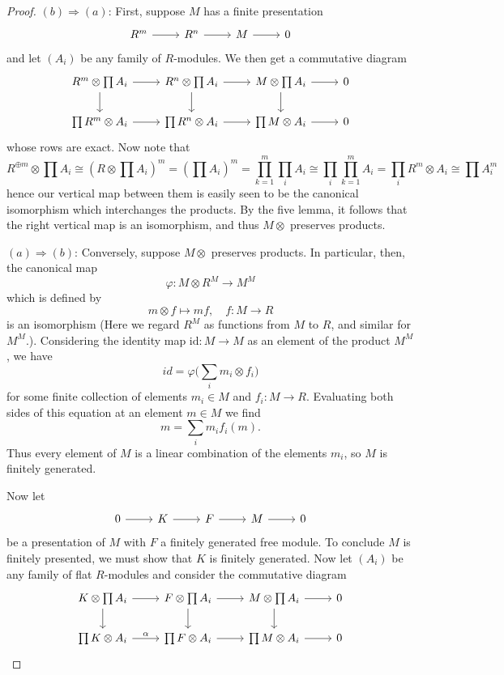 \begin{proof}
$(b)\Rightarrow(a)$: First, suppose $M$ has a finite presentation
\[\begin{tikzcd}
R^m\ar[r]&R^n\ar[r]&M\ar[r]&0
\end{tikzcd}\]
and let $(A_i)$ be any family of $R$-modules. We then get a commutative diagram
\[\begin{tikzcd}
R^m\otimes\prod A_i\ar[r]\ar[d]&R^n\otimes\prod A_i\ar[r]\ar[d]&M\otimes\prod A_i\ar[r]\ar[d]&0\\
\prod R^m\otimes A_i\ar[r]&\prod R^n\otimes A_i\ar[r]&\prod M\otimes A_i\ar[r]&0
\end{tikzcd}\]
whose rows are exact. Now note that 
\[R^{\oplus m}\otimes\prod A_i\cong(R\otimes\prod A_i)^m=(\prod A_i)^m=\prod_{k=1}^{m}\prod_i A_i\cong\prod_i\prod_{k=1}^{m} A_i=\prod_i R^m\otimes A_i\cong\prod A_i^m\]
hence our vertical map between them is easily seen to be the canonical isomorphism which interchanges the products. By the five lemma, it follows that the right vertical map is an isomorphism, and thus $M\otimes $ preserves products.\par
$(a)\Rightarrow(b)$: Conversely, suppose $M\otimes$ preserves products. In particular, then, the canonical map
\[\varphi:M\otimes R^M\to M^M\]
which is defined by
\[m\otimes f\mapsto mf,\quad f:M\to R\]
is an isomorphism (Here we regard $R^M$ as functions from $M$ to $R$, and similar for $M^M$.). Considering the identity map $\mathrm{id}:M\to M$ as an element of the product $M^M$, we have
\[id=\varphi\Big(\sum_im_i\otimes f_i\Big)\]
for some finite collection of elements $m_i\in M$ and $f_i:M\to R$. Evaluating both sides of this equation at an element $m\in M$ we find
\[m=\sum_im_if_i(m).\]
Thus every element of $M$ is a linear combination of the elements $m_i$, so $M$ is finitely generated.\par
Now let
\[\begin{tikzcd}
0\ar[r]&K\ar[r]&F\ar[r]&M\ar[r]&0
\end{tikzcd}\]
be a presentation of $M$ with $F$ a finitely generated free module. To conclude $M$ is finitely presented, we must show that $K$ is finitely generated. Now let $(A_i)$ be any family of flat $R$-modules and consider the commutative diagram
\[\begin{tikzcd}
K\otimes\prod A_i\ar[r]\ar[d]&F\otimes\prod A_i\ar[r]\ar[d]&M\otimes\prod A_i\ar[r]\ar[d]&0\\
\prod K\otimes A_i\ar[r,"\alpha"]&\prod F\otimes A_i\ar[r]&\prod M\otimes A_i\ar[r]&0
\end{tikzcd}\]

\end{proof}
